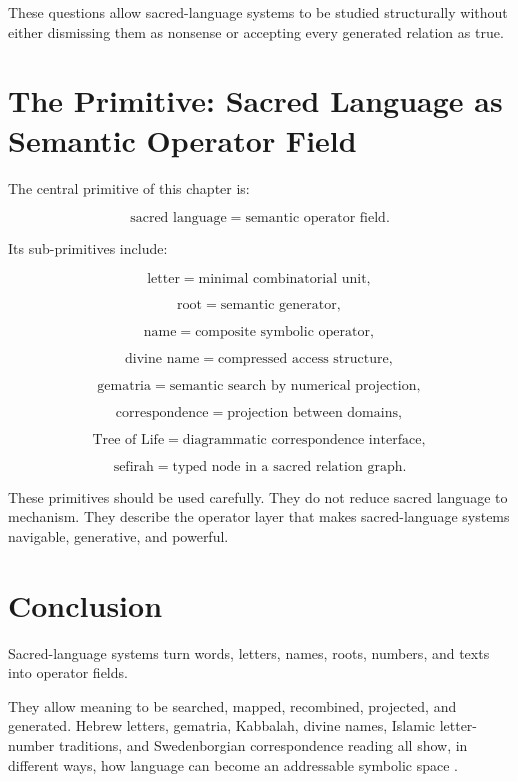 \documentclass[11pt]{book}
\begin{document}
These questions allow sacred-language systems to be studied structurally without either dismissing them as nonsense or accepting every generated relation as true.

\section{The Primitive: Sacred Language as Semantic Operator Field}

The central primitive of this chapter is:

\[
\text{sacred language} = \text{semantic operator field}.
\]

Its sub-primitives include:

\[
\text{letter} = \text{minimal combinatorial unit},
\]

\[
\text{root} = \text{semantic generator},
\]

\[
\text{name} = \text{composite symbolic operator},
\]

\[
\text{divine name} = \text{compressed access structure},
\]

\[
\text{gematria} = \text{semantic search by numerical projection},
\]

\[
\text{correspondence} = \text{projection between domains},
\]

\[
\text{Tree of Life} = \text{diagrammatic correspondence interface},
\]

\[
\text{sefirah} = \text{typed node in a sacred relation graph}.
\]

These primitives should be used carefully. They do not reduce sacred language to mechanism. They describe the operator layer that makes sacred-language systems navigable, generative, and powerful.

\section{Conclusion}

Sacred-language systems turn words, letters, names, roots, numbers, and texts into operator fields.

They allow meaning to be searched, mapped, recombined, projected, and generated. Hebrew letters, gematria, Kabbalah, divine names, Islamic letter-number traditions, and Swedenborgian correspondence reading all show, in different ways, how language can become an addressable symbolic space \cite{Scholem1974Kabbalah,Idel1988KabbalahNewPerspectives,Eco1995SearchPerfectLanguage,SwedenborgHeavenHell}.
\end{document}
